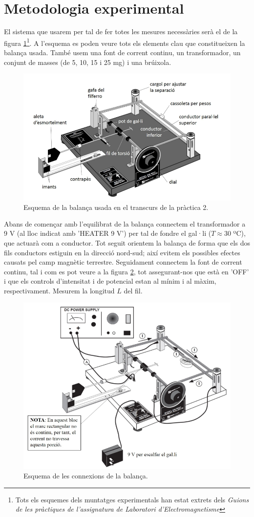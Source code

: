 \documentclass[a4paper,10.5pt]{report}
\begin{document}
\section{Metodologia experimental}

El sistema que usarem per tal de fer totes les mesures necessàries serà el de la figura \ref{fig:2.1}\footnote{Tots els esquemes dels muntatges experimentals han estat extrets dels \textit{Guions de les pràctiques de l'assignatura de Laboratori d'Electromagnetisme}\cite{ref3}}. A l'esquema es poden veure tots els elements clau que constitueixen la balança usada. També usem una font de corrent continu, un transformador, un conjunt de masses (de 5, 10, 15 i 25 mg) i una brúixola.

\begin{figure}[h]
	\centering
	\includegraphics[width=0.6\linewidth]{screenshot008}
	\caption{Esquema de la balança usada en el transcurs de la pràctica 2.}
	\label{fig:2.1}
\end{figure}

Abans de començar amb l'equilibrat de la balança connectem el transformador a 9 V (al lloc indicat amb 'HEATER 9 V') per tal de fondre el gal·li ($T \approx 30$ ºC), que actuarà com a conductor. Tot seguit orientem la balança de forma que els dos fils conductors estiguin en la direcció nord-sud; així evitem els possibles efectes causats pel camp magnètic terrestre. Seguidament connectem la font de corrent continu, tal i com es pot veure a la figura \ref{fig:2.2}, tot assegurant-nos que està en 'OFF' i que els controls d'intensitat i de potencial estan al mínim i al màxim, respectivament. Mesurem la longitud $L$ del fil.

\begin{figure}[h]
	\centering
	\includegraphics[width=0.6\linewidth]{screenshot009}
	\caption{Esquema de les connexions de la balança.}
	\label{fig:2.2}
\end{figure}
\end{document}
